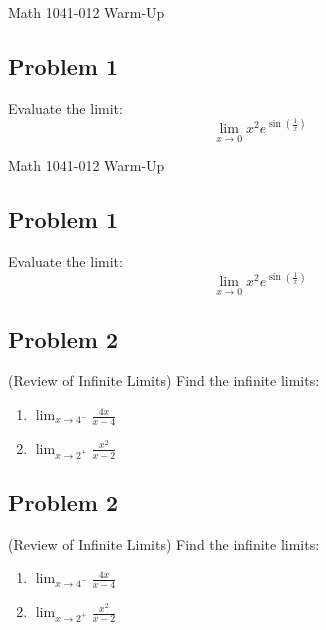 \documentclass[10pt]{book}
\theoremstyle{definition}
\begin{document}
\begin{center}
{\Large Math 1041-012 \hspace{0.5cm} Warm-Up}
\end{center}
\subsection*{Problem 1} Evaluate the limit:
\[
\lim_{x\rightarrow 0}x^2e^{\sin{\left(\frac{1}{x}\right)}}
\]
\vspace{10cm}
\begin{center}
{\Large Math 1041-012 \hspace{0.5cm} Warm-Up}
\end{center}
\subsection*{Problem 1} Evaluate the limit:
\[
\lim_{x\rightarrow 0}x^2e^{\sin{\left(\frac{1}{x}\right)}}
\]
\clearpage
\subsection*{Problem 2} (Review of Infinite Limits) Find the infinite limits:
\begin{enumerate}[label=(\alph*)]
    \item $\displaystyle\lim_{x\rightarrow 4^-}\frac{4x}{x-4}$\vspace{2cm}
    \item $\displaystyle\lim_{x\rightarrow 2^+}\frac{x^2}{x-2}$
\end{enumerate}
\vspace{7cm}
\subsection*{Problem 2} (Review of Infinite Limits) Find the infinite limits:
\begin{enumerate}[label=(\alph*)]
    \item $\displaystyle\lim_{x\rightarrow 4^-}\frac{4x}{x-4}$\vspace{2cm}
    \item $\displaystyle\lim_{x\rightarrow 2^+}\frac{x^2}{x-2}$
\end{enumerate}
\end{document}
